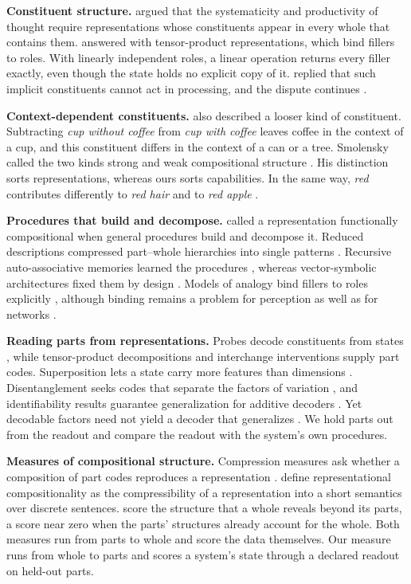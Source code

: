 \documentclass[10pt]{article}
\theoremstyle{plain}
\theoremstyle{remark}
\begin{document}
\textbf{Constituent structure.} \citet{fodor1988} argued that the systematicity and productivity of thought require representations whose constituents appear in every whole that contains them. \citet{smolensky1990} answered with tensor-product representations, which bind fillers to roles. With linearly independent roles, a linear operation returns every filler exactly, even though the state holds no explicit copy of it. \citet{fodor1990} replied that such implicit constituents cannot act in processing, and the dispute continues \citep{goodale2026}.

\textbf{Context-dependent constituents.} \citet{smolensky1988} also described a looser kind of constituent. Subtracting \emph{cup without coffee} from \emph{cup with coffee} leaves coffee in the context of a cup, and this constituent differs in the context of a can or a tree. Smolensky called the two kinds strong and weak compositional structure \citep{smolensky1987}. His distinction sorts representations, whereas ours sorts capabilities. In the same way, \emph{red} contributes differently to \emph{red hair} and to \emph{red apple} \citep{kamp1995}.

\textbf{Procedures that build and decompose.} \citet{vangelder1990} called a representation functionally compositional when general procedures build and decompose it. Reduced descriptions compressed part--whole hierarchies into single patterns \citep{hinton1990}. Recursive auto-associative memories learned the procedures \citep{pollack1990}, whereas vector-symbolic architectures fixed them by design \citep{plate1995,gayler2006,kanerva2009}. Models of analogy bind fillers to roles explicitly \citep{hummel1997}, although binding remains a problem for perception as well as for networks \citep{treisman1980,greff2020}.

\textbf{Reading parts from representations.} Probes decode constituents from states \citep{belinkov2022}, while tensor-product decompositions \citep{mccoy2019} and interchange interventions \citep{geiger2021} supply part codes. Superposition lets a state carry more features than dimensions \citep{elhage2022}. Disentanglement seeks codes that separate the factors of variation \citep{bengio2013,locatello2019}, and identifiability results guarantee generalization for additive decoders \citep{lachapelle2023,wiedemer2024}. Yet decodable factors need not yield a decoder that generalizes \citep{montero2021}. We hold parts out from the readout and compare the readout with the system's own procedures.

\textbf{Measures of compositional structure.} Compression measures ask whether a composition of part codes reproduces a representation \citep{andreas2019}. \citet{elmoznino2024} define representational compositionality as the compressibility of a representation into a short semantics over discrete sentences. \citet{elmoznino2026} score the structure that a whole reveals beyond its parts, a score near zero when the parts' structures already account for the whole. Both measures run from parts to whole and score the data themselves. Our measure runs from whole to parts and scores a system's state through a declared readout on held-out parts.
\end{document}
